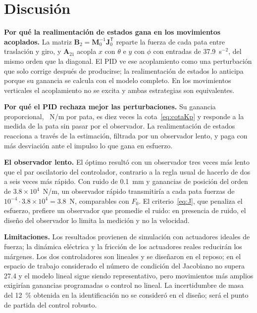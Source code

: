 \documentclass[conference]{IEEEtran}
\newcommand{\vect}[1]{\bm{#1}}
\newcommand{\T}{^{\mathsf{T}}}
\begin{document}
\section{Discusión}\label{sec:discusion}

\textbf{Por qué la realimentación de estados gana en los movimientos acoplados.} La matriz $\vect B_2 = \vect M_0^{-1}\vect J_0\T$ reparte la fuerza de cada pata entre traslación y giro, y $\vect A_{21}$ acopla $x$ con $\theta$ e $y$ con $\phi$ con entradas de 37.9~s$^{-2}$, del mismo orden que la diagonal. El PID ve ese acoplamiento como una perturbación que solo corrige después de producirse; la realimentación de estados lo anticipa porque su ganancia se calcula con el modelo completo. En los movimientos verticales el acoplamiento no se excita y ambas estrategias son equivalentes.

\textbf{Por qué el PID rechaza mejor las perturbaciones.} Su ganancia proporcional, \KpOpt~N/m por pata, es diez veces la cota~\eqref{eq:cotaKp} y responde a la medida de la pata sin pasar por el observador. La realimentación de estados reacciona a través de la estimación, filtrada por un observador lento, y paga con más desviación ante el impulso lo que gana en esfuerzo.

\textbf{El observador lento.} El óptimo resultó con un observador tres veces más lento que el par oscilatorio del controlador, contrario a la regla usual de hacerlo de dos a seis veces más rápido. Con ruido de 0.1~mm y ganancias de posición del orden de $3.8\times10^4$~N/m, un observador rápido transmitiría a cada pata fuerzas de $10^{-4}\cdot3.8\times10^4 = 3.8$~N, comparables con $F_0$. El criterio~\eqref{eq:J}, que penaliza el esfuerzo, prefiere un observador que promedie el ruido: en presencia de ruido, el diseño del observador lo limita la medición y no la velocidad.

\textbf{Limitaciones.} Los resultados provienen de simulación con actuadores ideales de fuerza; la dinámica eléctrica y la fricción de los actuadores reales reducirán los márgenes. Los dos controladores son lineales y se diseñaron en el reposo; en el espacio de trabajo considerado el número de condición del Jacobiano no supera 27.4 y el modelo lineal sigue siendo representativo, pero movimientos más amplios exigirían ganancias programadas o control no lineal. La incertidumbre de masa del 12~\% obtenida en la identificación no se consideró en el diseño; será el punto de partida del control robusto.
\end{document}
